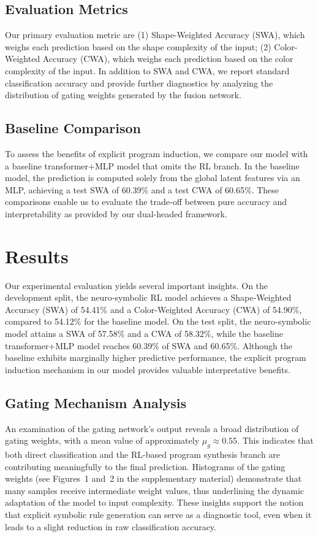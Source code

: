 \documentclass{article}
\begin{document}
\subsection{Evaluation Metrics}
Our primary evaluation metric are (1) Shape-Weighted Accuracy (SWA), which weighs each prediction based on the shape complexity of the input; (2) Color-Weighted Accuracy (CWA), which weighs each prediction based on the color complexity of the input. In addition to SWA and CWA, we report standard classification accuracy and provide further diagnostics by analyzing the distribution of gating weights generated by the fusion network.

\subsection{Baseline Comparison}
To assess the benefits of explicit program induction, we compare our model with a baseline transformer+MLP model that omits the RL branch. In the baseline model, the prediction is computed solely from the global latent features via an MLP, achieving a test SWA of 60.39\% and a test CWA of 60.65\%. These comparisons enable us to evaluate the trade-off between pure accuracy and interpretability as provided by our dual-headed framework.

\section{Results}
Our experimental evaluation yields several important insights. On the development split, the neuro‐symbolic RL model achieves a Shape‐Weighted Accuracy (SWA) of 54.41\% and a Color‐Weighted Accuracy (CWA) of 54.90\%, compared to 54.12\% for the baseline model. On the test split, the neuro‐symbolic model attains a SWA of 57.58\% and a CWA of 58.32\%, while the baseline transformer+MLP model reaches 60.39\% of SWA and 60.65\%. Although the baseline exhibits marginally higher predictive performance, the explicit program induction mechanism in our model provides valuable interpretative benefits.

\subsection{Gating Mechanism Analysis}
An examination of the gating network’s output reveals a broad distribution of gating weights, with a mean value of approximately \(\mu_g \approx 0.55\). This indicates that both direct classification and the RL-based program synthesis branch are contributing meaningfully to the final prediction. Histograms of the gating weights (see Figures~1 and~2 in the supplementary material) demonstrate that many samples receive intermediate weight values, thus underlining the dynamic adaptation of the model to input complexity. These insights support the notion that explicit symbolic rule generation can serve as a diagnostic tool, even when it leads to a slight reduction in raw classification accuracy.
\end{document}
